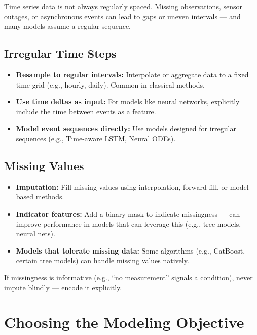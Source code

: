 \documentclass[12pt,openany]{book}
\begin{document}
Time series data is not always regularly spaced. Missing observations, sensor outages, or asynchronous events can lead to gaps or uneven intervals — and many models assume a regular sequence.


\subsection*{Irregular Time Steps}

\begin{itemize}
    \item \textbf{Resample to regular intervals:} Interpolate or aggregate data to a fixed time grid (e.g., hourly, daily). Common in classical methods.
    \item \textbf{Use time deltas as input:} For models like neural networks, explicitly include the time between events as a feature.
    \item \textbf{Model event sequences directly:} Use models designed for irregular sequences (e.g., Time-aware LSTM, Neural ODEs).
\end{itemize}


\subsection*{Missing Values}

\begin{itemize}
    \item \textbf{Imputation:} Fill missing values using interpolation, forward fill, or model-based methods.
    \item \textbf{Indicator features:} Add a binary mask to indicate missingness — can improve performance in models that can leverage this (e.g., tree models, neural nets).
    \item \textbf{Models that tolerate missing data:} Some algorithms (e.g., CatBoost, certain tree models) can handle missing values natively.
\end{itemize}

\begin{notebox}
If missingness is informative (e.g., “no measurement” signals a condition), never impute blindly — encode it explicitly.
\end{notebox}



\section{Choosing the Modeling Objective}
\end{document}

